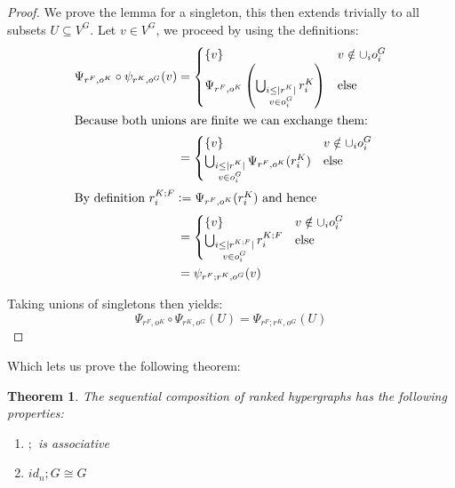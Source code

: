 \documentclass[12pt]{article}
\newtheorem{theorem}{Theorem}[section]
\theoremstyle{definition}
\newcommand{\defeq}{\vcentcolon=}
\newcommand{\1}{\mathbbm{1}}
\newcommand{\seq}{;}
\begin{document}
\begin{proof}
    We prove the lemma for a singleton, this then extends trivially to all subsets $U\subseteq V^G$. Let $v\in V^G$, we proceed by using the definitions:
    \begin{align*}
        \Psi_{r^F, o^K}\circ \psi_{r^K, o^G}(v) &= 
        \begin{cases}
            \{v\} & v\notin \cup_i o_i^G\\
            \Psi_{r^F, o^K}\left(\bigcup_{\substack{i \leq |r^K| \\ v \in o^G_i}} r^K_i\right) & \text{else}
        \end{cases}\\
        \intertext{Because both unions are finite we can exchange them: }
        &= 
        \begin{cases}
            \{v\} & v\notin \cup_i o_i^G\\
            \bigcup_{\substack{i \leq |r^K| \\ v \in o^G_i}} \Psi_{r^F, o^K} (r^K_i) & \text{else}\\
        \end{cases}\\
        \intertext{By definition $r^{K\seq F}_i \defeq \Psi_{r^F, o^K} (r^K_i)$ and hence}
        &=
        \begin{cases}
            \{v\} & v\notin \cup_i o_i^G\\
            \bigcup_{\substack{i\leq  |r^{K\seq F}| \\ v \in o^G_i}} r^{K\seq F}_i & \text{else}\\
        \end{cases}\\
        &= \psi_{r^F\seq r^K, o^G}(v)
    \end{align*}

    Taking unions of singletons then yields:
    \[
        \Psi_{r^F, o^K}\circ \Psi_{r^K, o^G}(U) = \Psi_{r^F\seq r^K, o^G}(U)
    \]
\end{proof}

Which lets us prove the following theorem:

\begin{theorem}\label{thm:assoc}
The sequential composition of ranked hypergraphs has the following properties:
    \begin{enumerate}
        \item $\seq$ is associative
        \item $id_n \seq G \cong G$
    \end{enumerate}
\end{theorem} %
\end{document}
